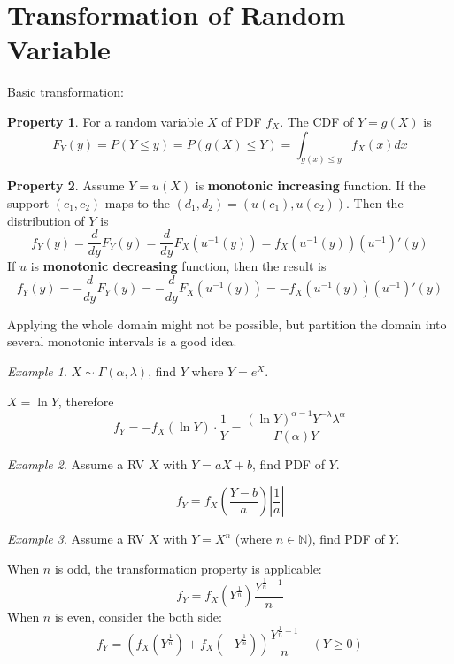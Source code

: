 \documentclass[12pt,a4paper,twoside]{article}
\theoremstyle{definition}
\newtheorem{property}{Property}[section]
\theoremstyle{remark}
\newtheorem*{example}{Example}
\begin{document}
    \section{Transformation of Random Variable}
    Basic transformation:
    \begin{property}
        For a random variable $X$ of PDF $f_X$. The CDF of $Y = g(X)$ is 
        \[ F_Y(y) = P(Y \leq y) = P(g(X) \leq Y) = \int_{g(x) \leq y} f_X(x) dx \] 
    \end{property}
    \begin{property}
        Assume $Y = u(X)$ is \textbf{monotonic increasing} function. If the support $(c_1, c_2)$ maps to the $(d_1, d_2) = (u(c_1), u(c_2))$.
        Then the distribution of $Y$ is 
        \[ f_Y(y) = \frac{d}{dy} F_Y(y) = \frac{d}{dy} F_X(u^{-1}(y)) = f_X(u^{-1}(y))(u^{-1})'(y) \] 
        If $u$ is \textbf{monotonic decreasing} function, then the result is
        \[ f_Y(y) = -\frac{d}{dy} F_Y(y) = -\frac{d}{dy} F_X(u^{-1}(y)) = -f_X(u^{-1}(y))(u^{-1})'(y) \] 
    \end{property}
    Applying the whole domain might not be possible, but partition the domain into several monotonic intervals is a good idea.
    \begin{example}
        $X \sim \Gamma(\alpha, \lambda)$, find $Y$ where $Y = e^X$.

        $X = \ln Y$, therefore 
        \[ f_Y = -f_X(\ln Y) \cdot \frac 1 Y = \frac{(\ln Y)^{\alpha-1}Y^{-\lambda}\lambda^\alpha}{\Gamma(\alpha)Y} \]
    \end{example}
    \begin{example}
        Assume a RV $X$ with $Y = aX + b$, find PDF of $Y$.

        \[ f_Y = f_X\left(\frac{Y - b}{a}\right) \left|\frac 1 a\right| \]
    \end{example}
    \begin{example}
        Assume a RV $X$ with $Y = X^n$ (where $n \in \mathbb N$), find PDF of $Y$.
        
        When $n$ is odd, the transformation property is applicable:
        \[ f_Y = f_X\left(Y^{\frac 1 n}\right) \frac{Y^{\frac 1 n-1}}{n} \]
        When $n$ is even, consider the both side:
        \[ f_Y = \left(f_X\left(Y^{\frac 1 n}\right) + f_X\left(-Y^{\frac 1 n}\right)\right) \frac{Y^{\frac 1 n-1}}{n}  \quad (Y \geq 0)\]
    \end{example}
    
\end{document}
